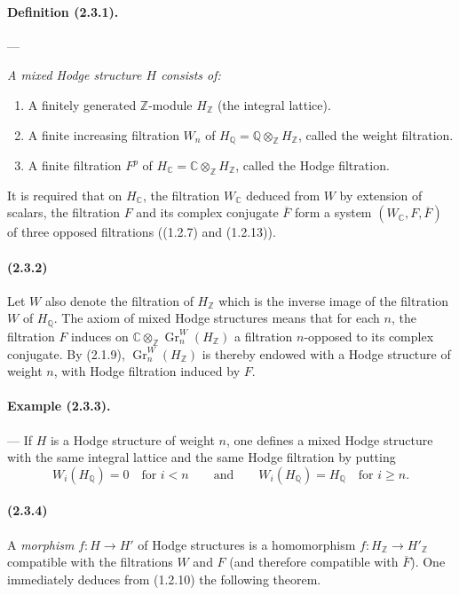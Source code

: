 \documentclass[10pt]{article}
\newcommand{\C}{\mathbb C}
\newcommand{\Q}{\mathbb Q}
\newcommand{\Z}{\mathbb Z}
\newcommand{\Gr}{\operatorname{Gr}}
\newcommand{\fg}{\guillemotright}
\newcommand{\og}{\guillemotleft}
\begin{document}
\paragraph{Definition (2.3.1).} --- {\itshape A mixed Hodge structure $H$ consists of:
\begin{enumerate}[label=\alph*)]
\item A finitely generated $\Z$-module $H_\Z$ (the \og integral lattice\fg{}).
\item A finite increasing filtration $W_n$ of $H_\Q=\Q\otimes_\Z H_\Z$, called the weight filtration.
\item A finite filtration $F^p$ of $H_\C=\C\otimes_\Z H_\Z$, called the Hodge filtration.
\end{enumerate}
It is required that on $H_\C$, the filtration $W_\C$ deduced from $W$ by extension of scalars, the filtration $F$ and its complex conjugate $\overline F$ form a system $(W_\C,F,\overline F)$ of three opposed filtrations ((1.2.7) and (1.2.13)).}

\paragraph{(2.3.2)} Let $W$ also denote the filtration of $H_\Z$ which is the inverse image of the filtration $W$ of $H_\Q$. The axiom of mixed Hodge structures means that for each $n$, the filtration $F$ induces on $\C\otimes_\Z\Gr_n^W(H_\Z)$ a filtration $n$-opposed to its complex conjugate. By (2.1.9), $\Gr_n^W(H_\Z)$ is thereby endowed with a Hodge structure of weight $n$, with Hodge filtration induced by $F$.

\paragraph{Example (2.3.3).} --- If $H$ is a Hodge structure of weight $n$, one defines a mixed Hodge structure with the same integral lattice and the same Hodge filtration by putting
\[
W_i(H_\Q)=0\quad\text{for } i<n\qquad\text{and}\qquad
W_i(H_\Q)=H_\Q\quad\text{for } i\ge n.
\]

\paragraph{(2.3.4)} A \emph{morphism} $f:H\to H'$ of Hodge structures is a homomorphism $f:H_\Z\to H'_\Z$ compatible with the filtrations $W$ and $F$ (and therefore compatible with $\overline F$). One immediately deduces from (1.2.10) the following theorem.
\end{document}
